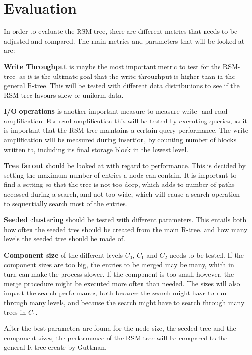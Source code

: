 \section{Evaluation}
In order to evaluate the RSM-tree, there are different metrics that needs to be adjusted and compared. The main metrics and parameters that will be looked at are:\newline

\noindent
\textbf{Write Throughput} is maybe the most important metric to test for the RSM-tree, as it is the ultimate goal that the write throughput is higher than in the general R-tree. This will be tested with different data distributions to see if the RSM-tree favours skew or uniform data. \newline

\noindent
\textbf{I/O operations} is another important measure to measure write- and read amplification. For read amplification this will be tested by executing queries, as it is important that the RSM-tree maintains a certain query performance. The write amplification will be measured during insertion, by counting number of blocks written to, including its final storage block in the lowest level. \newline

\noindent
\textbf{Tree fanout} should be looked at with regard to performance. This is decided by setting the maximum number of entries a node can contain. It is important to find a setting so that the tree is not too deep, which adds to number of paths accessed during a search, and not too wide, which will cause a search operation to sequentially search most of the entries. \newline

\noindent
\textbf{Seeded clustering} should be tested with different parameters. This entails both how often the seeded tree should be created from the main R-tree, and how many levels the seeded tree should be made of. 

\textbf{Component size} of the different levels $C_0$, $C_1$ and $C_2$ needs to be tested. If the component sizes are too big, the entries to be merged may be many, which in turn can make the process slower. If the component is too small however, the merge procedure might be executed more often than needed. The sizes will also impact the search performance, both because the search might have to run through many levels, and because the search might have to search through many trees in $C_1$.

After the best parameters are found for the node size, the seeded tree and the component sizes, the performance of the RSM-tree will be compared to the general R-tree create by Guttman\cite{r-tree}. 